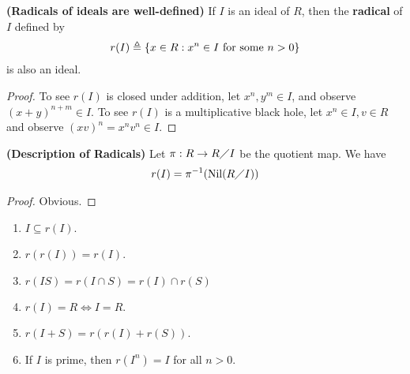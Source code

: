 \documentclass{report}
\begin{document}
\begin{theorem}
\textbf{(Radicals of ideals are well-defined)} If $I$ is an ideal of $R$, then the  \textbf{radical} of $I$ defined by 
 \begin{align*}
r(I)\triangleq  \{ x\in R: x^n\in I\text{ for some }n>0 \}
\end{align*}
is also an ideal. 
\end{theorem}
\begin{proof}
  To see $r(I)$ is closed under addition, let $x^n,y^m \in I$, and observe $(x+y)^{n+m}\in I$. To see $r(I)$ is a multiplicative black hole, let $x^n\in I,v \in R$ and observe $(xv)^n=x^nv^n \in I$. 
\end{proof}
\begin{theorem}
\textbf{(Description of Radicals)} Let $\pi : R \rightarrow R \diagup I$ be the quotient map. We have
\begin{align*}
r(I)= \pi ^{-1}(\operatorname{Nil}(R\diagup I)) 
\end{align*}
\end{theorem}
\begin{proof}
Obvious. 
\end{proof}
\begin{question}{}{}
  \begin{enumerate}[label=(\alph*)]
    \item $I \subseteq r(I)$. 
    \item $r(r(I))=r(I)$.  
    \item $r(IS)=r(I\cap S)=r(I)\cap r(S)$
    \item $r(I)=R \iff  I= R$. 
    \item $r(I+S)=r(r(I)+r(S))$. 
    \item If $I$ is prime, then  $r(I^n)=I$ for all $n>0$. 
  \end{enumerate}
\end{question}
\end{document}
